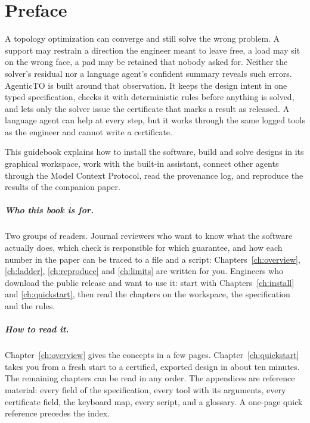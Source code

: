\chapter*{Preface}

A topology optimization can converge and still solve the wrong problem. A support may restrain a direction the
engineer meant to leave free, a load may sit on the wrong face, a pad may be retained that nobody asked for. Neither the
solver's residual nor a language agent's confident summary reveals such errors. AgenticTO is built around that
observation. It keeps the design intent in one typed specification, checks it with deterministic rules before anything
is solved, and lets only the solver issue the certificate that marks a result as released. A language agent can help
at every step, but it works through the same logged tools as the engineer and cannot write a certificate.

This guidebook explains how to install the software, build and solve designs in its graphical workspace, work with the
built-in assistant, connect other agents through the Model Context Protocol, read the provenance log, and reproduce the
results of the companion paper.

\paragraph{Who this book is for.} Two groups of readers. Journal reviewers who want to know what the software actually
does, which check is responsible for which guarantee, and how each number in the paper can be traced to a file and a
script: Chapters~\ref{ch:overview}, \ref{ch:ladder}, \ref{ch:reproduce} and \ref{ch:limits} are written for you.
Engineers who download the public release and want to use it: start with Chapters~\ref{ch:install} and
\ref{ch:quickstart}, then read the chapters on the workspace, the specification and the rules.

\paragraph{How to read it.} Chapter~\ref{ch:overview} gives the concepts in a few pages. Chapter~\ref{ch:quickstart}
takes you from a fresh start to a certified, exported design in about ten minutes. The remaining chapters can be read in
any order. The appendices are reference material: every field of the specification, every tool with its arguments,
every certificate field, the keyboard map, every script, and a glossary. A one-page quick reference precedes the
index.

